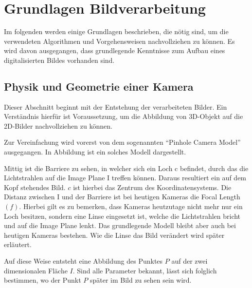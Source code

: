 \section{Grundlagen Bildverarbeitung}
\label{sec:basics}
Im folgenden werden einige Grundlagen beschrieben, die nötig sind, um die verwendeten Algorithmen und Vorgehensweisen nachvollziehen zu können. Es wird davon ausgegangen, dass grundlegende Kenntnisse zum Aufbau eines digitalisierten Bildes vorhanden sind. 
\subsection{Physik und Geometrie einer Kamera}
\label{sec:camerageo}
Dieser Abschnitt beginnt mit der Entstehung der verarbeiteten Bilder. Ein Verständnis hierfür ist Voraussetzung, um die Abbildung von 3D-Objekt auf die 2D-Bilder nachvollziehen zu können.

Zur Vereinfachung wird vorerst von dem sogenannten "`Pinhole Camera Model"' ausgegangen. In Abbildung  ist ein solches Modell dargestellt. 

Mittig ist die Barriere zu sehen, in welcher sich ein Loch c befindet, durch das die Lichtstrahlen auf die Image Plane I treffen können. Daraus resultiert ein auf dem Kopf stehendes Bild. $c$ ist hierbei das Zentrum des Koordinatensystems.
Die Distanz zwischen I und der Barriere ist bei heutigen Kameras die Focal Length $(f)$. Hierbei gilt es zu bemerken, dass Kameras heutzutage nicht mehr nur ein Loch besitzen, sondern eine Linse eingesetzt ist, welche die Lichtstrahlen bricht und auf die Image Plane lenkt. Das grundlegende Modell bleibt aber auch bei heutigen Kameras bestehen. Wie die Linse das Bild verändert wird später erläutert. 

Auf diese Weise entsteht eine Abbildung des Punktes $P$ auf der zwei dimensionalen Fläche $I$. Sind alle Parameter bekannt, lässt sich folglich bestimmen, wo der Punkt $P$ später im Bild zu sehen sein wird. 


